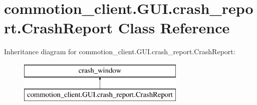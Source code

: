 \hypertarget{classcommotion__client_1_1GUI_1_1crash__report_1_1CrashReport}{\section{commotion\+\_\+client.\+G\+U\+I.\+crash\+\_\+report.\+Crash\+Report Class Reference}
\label{classcommotion__client_1_1GUI_1_1crash__report_1_1CrashReport}
}
Inheritance diagram for commotion\+\_\+client.\+G\+U\+I.\+crash\+\_\+report.\+Crash\+Report\+:\begin{figure}[H]
\begin{center}
\leavevmode
\includegraphics[height=2.000000cm]{classcommotion__client_1_1GUI_1_1crash__report_1_1CrashReport}
\end{center}
\end{figure}
